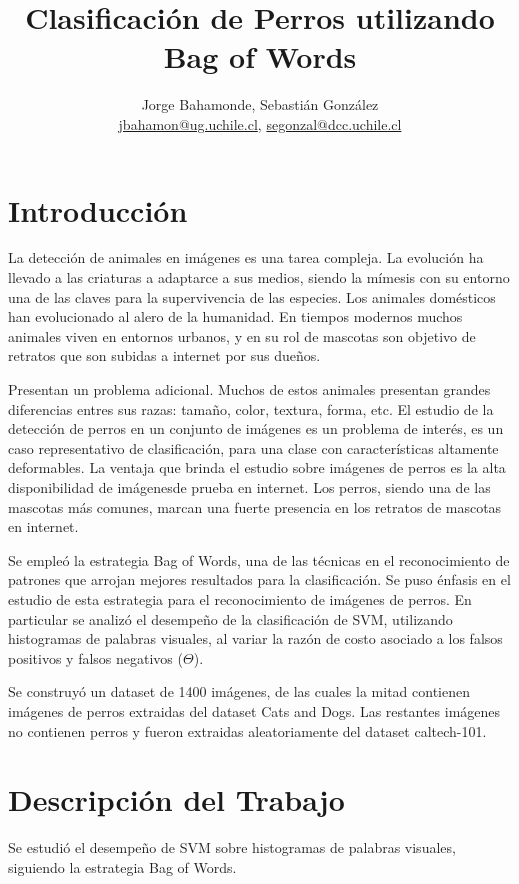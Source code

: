 \documentclass[12pt]{article}
\title{Clasificación de Perros utilizando Bag of Words}
\author{Jorge Bahamonde, Sebastián González\\
\small{\url{jbahamon@ug.uchile.cl}, \url{segonzal@dcc.uchile.cl}}}
\date{}
\begin{document}
\maketitle

\section{Introducción}

La detección de animales en imágenes es una tarea compleja. La evolución ha llevado a
las criaturas a adaptarce a sus medios, siendo la mímesis con su entorno una de las claves para la supervivencia de las especies.
Los animales domésticos han evolucionado al alero de la humanidad. En tiempos modernos muchos animales viven en entornos urbanos,
y en su rol de mascotas son objetivo de retratos que son subidas a internet por sus dueños.

Presentan un problema adicional. Muchos de estos animales presentan grandes diferencias entres sus razas: tamaño, color, textura, forma, etc.
El estudio de la detección de perros en un conjunto de imágenes es un problema de interés, es un caso representativo de clasificación, para una clase con características
altamente deformables. La ventaja que brinda el estudio sobre imágenes de perros es la alta disponibilidad de imágenesde prueba en internet.
Los perros, siendo una de las mascotas más comunes, marcan una fuerte presencia en los retratos de mascotas en internet.

Se empleó la estrategia Bag of Words, una de las técnicas en el reconocimiento de patrones que arrojan mejores resultados para la clasificación.
Se puso énfasis en el estudio de esta estrategia para el reconocimiento de imágenes de perros. En particular se analizó el desempeño de la clasificación de SVM,
utilizando histogramas de palabras visuales, al variar la razón de costo asociado a los falsos positivos y falsos negativos ($\Theta$).

Se construyó un dataset de 1400 imágenes, de las cuales la mitad contienen imágenes de perros extraidas del dataset Cats and Dogs\cite{parkhi12a}.
Las restantes imágenes no contienen perros y fueron extraidas aleatoriamente del dataset caltech-101\cite{caltech101}.

\section{Descripción del Trabajo}

Se estudió el desempeño de SVM sobre histogramas de palabras visuales, siguiendo la estrategia Bag of Words.
\end{document}
